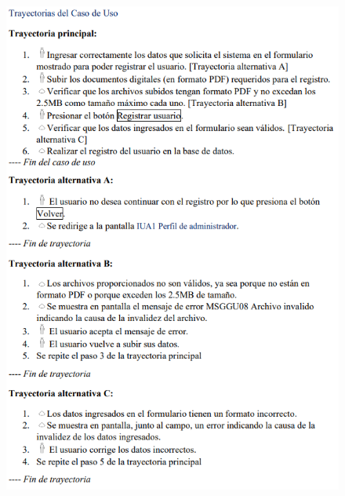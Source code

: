 \documentclass[12pt,letterpaper]{article}
\begin{document}
            \begin{figure}[H]
                \centering
                \includegraphics [scale=0.85]{specs/trayRegistrarUsuario}
            \end{figure}
\end{document}

